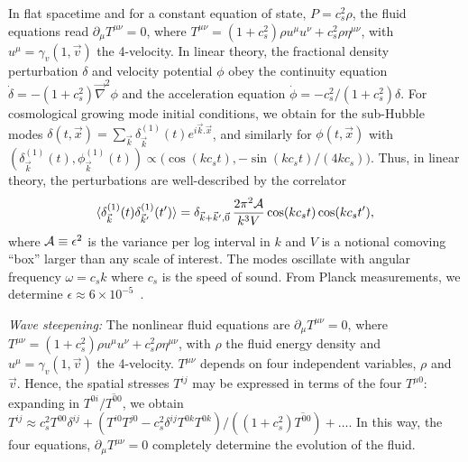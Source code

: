 \documentclass[prl,aps,10pt,twocolumn,showkeys,nofootinbib]{revtex4-1}
\def\ben{\begin{equation}}
\def\een{\end{equation}}
\begin{document}
In flat spacetime and for a constant equation of state, $P=c_s^2 \rho$, the fluid equations read $\partial_\mu T^{\mu \nu}=0$, where $T^{\mu \nu}=(1+c_s^2) \rho u^\mu u^\nu +c_s^2 \rho \eta^{\mu \nu}$, with $u^\mu=\gamma_{v}(1,\vec{v})$ the 4-velocity. In linear theory, the fractional density perturbation $\delta$ and velocity potential $\phi$ obey the continuity equation $\dot{\delta}=-(1+c_s^2) \vec{\nabla}^2 \phi$ and the acceleration equation $\dot{\phi}=-c_s^2/(1+c_s^2) \delta$. For cosmological growing mode initial conditions, we obtain for the sub-Hubble modes $\delta(t,\vec{x})=\sum_{\vec{k}} \delta^{(1)}_{\vec{k}} (t) e^{i\vec{k}.\vec{x}}$,  and similarly for $\phi(t,\vec{x})$ with $ ( \delta^{(1)}_{\vec{k}} (t) ,  \phi^{(1)}_{\vec{k}} (t) )\propto \bigl(\cos (k c_s t),-\sin (k c_s t)/(4 k c_s)\bigr).$ Thus, in linear theory, the perturbations are well-described by the correlator
\ben
\langle\delta^{(1)}_{\vec{k}}(t)\delta^{(1)}_{\vec{k}'}(t') \rangle=\delta_{\vec{k}+\vec{k}',\vec{0}}\,{2 \pi^2{ \cal A}\over k^3 V} \cos(k c_s t) \cos(k c_s t'),
\label{eq1}
\een
where ${\cal A}\equiv \epsilon^2$ is the variance per log interval in $k$ and $V$ is a notional comoving ``box'' larger than any scale of interest. The modes oscillate with angular frequency $\omega=c_s k$ where $c_s$ is the speed of sound. From Planck measurements, we determine $\epsilon\approx 6\times 10^{-5}$~\cite{foottilt}.

{\it Wave steepening:} 
The nonlinear fluid equations are $\partial_\mu T^{\mu \nu}=0$, where $T^{\mu \nu}=(1+c_s^2) \rho u^\mu u^\nu +c_s^2 \rho \eta^{\mu \nu}$, with $\rho$ the fluid energy density and $u^\mu=\gamma_{v}(1,\vec{v})$ the 4-velocity.  $T^{\mu \nu}$ depends on four independent variables, $\rho$ and $\vec{v}$. Hence, the spatial stresses $T^{ij}$ may be expressed in terms of the four $T^{\mu 0}$: expanding in $T^{0i}/\overline{T^{00}}$, we obtain $T^{ij}\approx c_s^2 T^{00}\delta^{ij} +(T^{i 0}T^{j 0}-c_s^2\delta^{ij} T^{0k} T^{0k})/((1+c_s^2)\overline{T^{00}})+\dots$. In this way, the four equations, $\partial_\mu T^{\mu \nu}=0$ completely determine the evolution of the fluid. 
\end{document}
